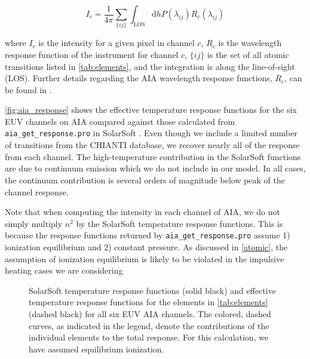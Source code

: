 \begin{equation}\label{eq:intensity}
    I_c = \frac{1}{4\pi}\sum_{\{ij\}}\int_{\text{LOS}}\mathrm{d}hP(\lambda_{ij})R_c(\lambda_{ij})
\end{equation}

where $I_c$ is the intensity for a given pixel in channel $c$, $R_c$ is the wavelength response function of the instrument for channel $c$, $\{ij\}$ is the set of all atomic transitions listed in \autoref{tab:elements}, and the integration is along the line-of-sight (LOS). Further details regarding the AIA wavelength response functions, $R_c$, can be found in \citet{boerner_initial_2012}.

\autoref{fig:aia_response} shows the effective temperature response functions for the six EUV channels on AIA compared against those calculated from \texttt{aia\_get\_response.pro} in SolarSoft \citep{freeland_data_1998}. Even though we include a limited number of transitions from the CHIANTI database, we recover nearly all of the response from each channel. The high-temperature contribution in the SolarSoft functions are due to continuum emission which we do not include in our model. In all cases, the continuum contribution is several orders of magnitude below peak of the channel response.

Note that when computing the intensity in each channel of AIA, we do not simply multiply $n^2$ by the SolarSoft temperature response functions. This is because the response functions returned by \texttt{aia\_get\_response.pro} assume 1) ionization equilibrium and 2) constant pressure. As discussed in \autoref{atomic}, the assumption of ionization equilibrium is likely to be violated in the impulsive heating cases we are considering 

\begin{figure}
    \caption{}
    \label{fig:nt_phase_space}
\end{figure}

\begin{figure*}
    \caption{SolarSoft temperature response functions (solid black) and effective temperature response functions for the elements in \autoref{tab:elements} (dashed black) for all six EUV AIA channels. The colored, dashed curves, as indicated in the legend, denote the contributions of the individual elements to the total response. For this calculation, we have assumed equilibrium ionization.}
    \label{fig:aia_response}
\end{figure*}

